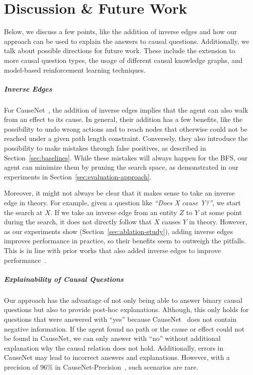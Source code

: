 %

\chapter{Discussion \& Future Work}
\label{ch:discussion}

Below, we discuss a few points, like the addition of inverse edges and how our approach 
can be used to explain the answers to causal questions. Additionally, we talk 
about possible directions for future work. These include the extension 
to more causal question types, the usage of different causal knowledge graphs, and 
model-based reinforcement learning techniques.

\paragraph{Inverse Edges}
For CauseNet~\cite{Heindorf2020Causenet}, the addition of inverse edges implies that the agent can also 
walk from an effect to its cause. In general, their addition has a few benefits, 
like the possibility to undo wrong actions and to reach nodes that otherwise could not be 
reached under a given path length constraint. Conversely, they also introduce the possibility 
to make mistakes through false positives, as described in Section~\ref{sec:baselines}. While these mistakes 
will always happen for the BFS, 
our agent can minimize them by pruning the search space, as demonstrated in our experiments in Section~\ref{sec:evaluation-approach}.

Moreover, it might not always be clear that it makes sense to take an inverse edge in theory.
For example, given a question like \textit{``Does X cause Y?''}, we start the search at $X$.
If we take an inverse edge from an entity $Z$ to $Y$ at some point during the search, 
it does not directly follow that $X$ causes $Y$ in theory.
However, as our experiments show (Section~\ref{sec:ablation-study}), adding 
inverse edges improves performance in practice, so their benefits seem to outweigh the pitfalls.
This is in line with prior works that also added inverse edges to improve performance~\cite{Xiong2017DeePpath,Das2018Minerva}.

\paragraph{Explainability of Causal Questions}
Our approach has the advantage of not only being able to answer binary causal 
questions but also to provide post-hoc explanations. Although, this only holds 
for questions that were answered with ``yes'' because CauseNet~\cite{Heindorf2020Causenet} does not contain 
negative information. If the agent found no path or the cause or effect 
could not be found in CauseNet, we can only answer with ``no'' without additional explanation why the causal 
relation does not hold.
Additionally, errors in CauseNet may lead to incorrect answers and explanations. 
However, with a precision of 96\% in CauseNet-Precision~\cite{Heindorf2020Causenet}, such scenarios are rare.

